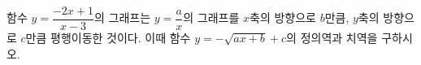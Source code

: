 \hspace*{2mm}\begin{minipage}[t]{\dimexpr\linewidth-2mm\relax}\vspace{0pt}
함수 $y=\dfrac{-2x+1}{x-3}$의 그래프는 $y=\dfrac{a}{x}$의 그래프를 $x$축의 방향으로 $b$만큼, $y$축의 방향으로 $c$만큼 평행이동한 것이다. 이때 함수 $y=-\sqrt{ax+b}+c$의 정의역과 치역을 구하시오. \end{minipage}
